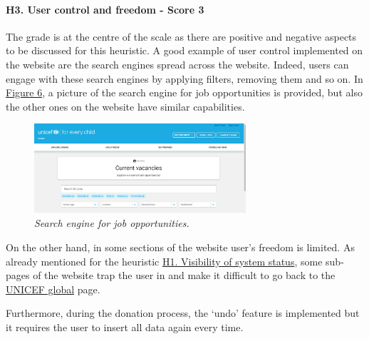 







\paragraph{H3. User control and freedom - Score 3} \label{subsec:H3}	The grade is at the centre of the scale as there are positive and negative aspects to be discussed for this heuristic. A good example of user control implemented on the website are the search engines spread across the website. Indeed, users can engage with these search engines by applying filters, removing them and so on. In \hyperref[fig:job]{Figure 6}, a picture of the search engine for job opportunities is provided, but also the other ones on the website have similar capabilities. 
\begin{figure}[!h]
	\label{fig:job}
	\begin{center}
		\includegraphics[width=0.7\textwidth]{FinalScores6.jpg}
		\captionsetup{font=small}
		\caption{\textit{Search engine for job opportunities.}}
	\end{center}
\end{figure}
\newline On the other hand, in some sections of the website user's freedom is limited.
As already mentioned for the heuristic \hyperref[subsec:H1]{H1. Visibility of system status}, some sub-pages of the website trap the user in and make it difficult to go back to the \href{https://www.unicef.org/}{UNICEF global} page.

Furthermore, during the donation process, the ‘undo’ feature is implemented but it requires the user to insert all data again every time.

